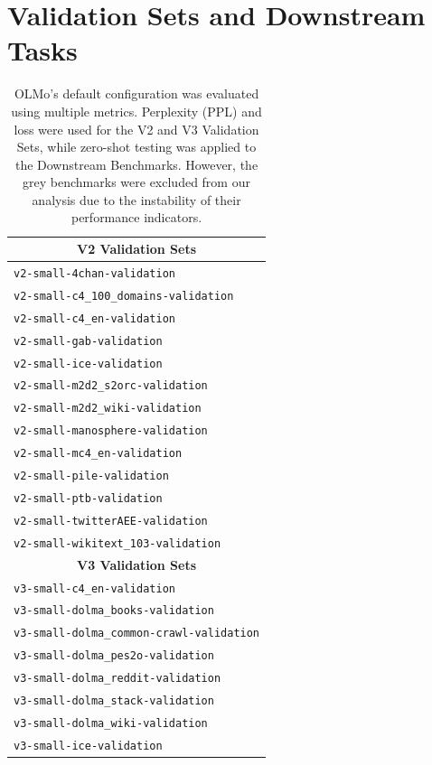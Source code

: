 \section{Validation Sets and Downstream Tasks}
\begin{table}[h]
\caption{OLMo's default configuration was evaluated using multiple metrics. Perplexity (PPL) and loss were used for the V2 and V3 Validation Sets, while zero-shot testing was applied to the Downstream Benchmarks. However, the grey benchmarks were excluded from our analysis due to the instability of their performance indicators.}
\centering
\begin{tabular}{|l|}
\hline
\multicolumn{1}{|c|}{\textbf{V2 Validation Sets}} \\
\hline
\texttt{v2-small-4chan-validation} \\
\texttt{v2-small-c4\_100\_domains-validation} \\
\texttt{v2-small-c4\_en-validation} \\
\texttt{v2-small-gab-validation} \\
\texttt{v2-small-ice-validation} \\
\texttt{v2-small-m2d2\_s2orc-validation} \\
\texttt{v2-small-m2d2\_wiki-validation} \\
\texttt{v2-small-manosphere-validation} \\
\texttt{v2-small-mc4\_en-validation} \\
\texttt{v2-small-pile-validation} \\
\texttt{v2-small-ptb-validation} \\
\texttt{v2-small-twitterAEE-validation} \\
\texttt{v2-small-wikitext\_103-validation} \\
\hline
\multicolumn{1}{|c|}{\textbf{V3 Validation Sets}} \\
\hline
\texttt{v3-small-c4\_en-validation} \\
\texttt{v3-small-dolma\_books-validation} \\
\texttt{v3-small-dolma\_common-crawl-validation} \\
\texttt{v3-small-dolma\_pes2o-validation} \\
\texttt{v3-small-dolma\_reddit-validation} \\
\texttt{v3-small-dolma\_stack-validation} \\
\texttt{v3-small-dolma\_wiki-validation} \\
\texttt{v3-small-ice-validation} \\

\end{tabular}
\end{table}
